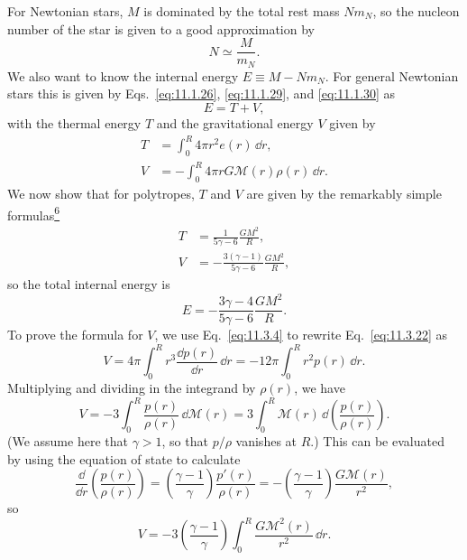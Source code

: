 For Newtonian stars, \(M\) is dominated by the total rest mass \(Nm_N\), so
the nucleon number of the star is given to a good approximation by
\begin{equation}
  N\simeq\frac{M}{m_N}.
  \tag{11.3.19}\label{eq:11.3.19}
\end{equation}
We also want to know the internal energy \(E\equiv M-Nm_N\). For general
Newtonian stars this is given by Eqs.~\eqref{eq:11.1.26},
\eqref{eq:11.1.29}, and \eqref{eq:11.1.30} as
\begin{equation}
  E=T+V,
  \tag{11.3.20}\label{eq:11.3.20}
\end{equation}
with the thermal energy \(T\) and the gravitational energy \(V\) given by
\begin{align}
  T&=\int_0^R4\pi r^2e(r)\,\dd r,
  \tag{11.3.21}\label{eq:11.3.21}\\
  V&=-\int_0^R4\pi rG\mathcal{M}(r)\rho(r)\,\dd r.
  \tag{11.3.22}\label{eq:11.3.22}
\end{align}
We now show that for polytropes, \(T\) and \(V\) are given by the remarkably
simple formulas\hyperref[ch11-ref-6]{\textsuperscript{6}}
\begin{align}
  T&=\frac1{5\gamma-6}\frac{GM^2}{R},
  \tag{11.3.23}\label{eq:11.3.23}\\
  V&=-\frac{3(\gamma-1)}{5\gamma-6}\frac{GM^2}{R},
  \tag{11.3.24}\label{eq:11.3.24}
\end{align}
so the total internal energy is
\begin{equation}
  E=-\frac{3\gamma-4}{5\gamma-6}\frac{GM^2}{R}.
  \tag{11.3.25}\label{eq:11.3.25}
\end{equation}
To prove the formula for \(V\), we use Eq.~\eqref{eq:11.3.4} to rewrite
Eq.~\eqref{eq:11.3.22} as
\begin{equation}
  V
  =
  4\pi\int_0^Rr^3\frac{\dd p(r)}{\dd r}\,\dd r
  =
  -12\pi\int_0^Rr^2p(r)\,\dd r.
  \tag{11.3.26}\label{eq:11.3.26}
\end{equation}
Multiplying and dividing in the integrand by \(\rho(r)\), we have
\[
  V
  =
  -3\int_0^R\frac{p(r)}{\rho(r)}\,\dd\mathcal{M}(r)
  =
  3\int_0^R\mathcal{M}(r)\,
  \dd\left(\frac{p(r)}{\rho(r)}\right).
\]
(We assume here that \(\gamma>1\), so that \(p/\rho\) vanishes at \(R\).)
This can be evaluated by using the equation of state to calculate
\[
  \frac{\dd}{\dd r}\left(\frac{p(r)}{\rho(r)}\right)
  =
  \left(\frac{\gamma-1}{\gamma}\right)
  \frac{p'(r)}{\rho(r)}
  =
  -\left(\frac{\gamma-1}{\gamma}\right)
  \frac{G\mathcal{M}(r)}{r^2},
\]
so
\begin{equation}
  V
  =
  -3\left(\frac{\gamma-1}{\gamma}\right)
  \int_0^R\frac{G\mathcal{M}^2(r)}{r^2}\,\dd r.
  \tag{11.3.27}\label{eq:11.3.27}
\end{equation}
